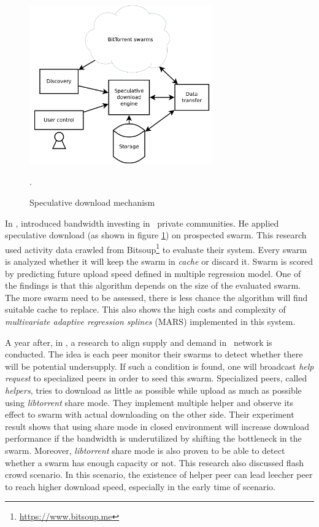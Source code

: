 \begin{figure}[t]
	\centering
	\includegraphics[width=0.7\textwidth]{pics/SDE2013.png}
	\caption{Speculative download mechanism \cite{2013:investmentcm:capota}}.
	\label{fig:sde13}
\end{figure}

In \citeyear{2013:investmentcm:capota}, \citeauthor{2013:investmentcm:capota} introduced bandwidth investing in \bt~private communities. He applied speculative download (as shown in figure \ref{fig:sde13}) on prospected swarm. This research used activity data crawled from Bitsoup\footnote{\url{https://www.bitsoup.me}} to evaluate their system. Every swarm is analyzed whether it will keep the swarm in \textit{cache} or discard it. Swarm is scored by predicting future upload speed defined in multiple regression model\cite{2013:investmentcm:capota}. One of the findings is that this algorithm depends on the size of the evaluated swarm. The more swarm need to be assessed, there is less chance the algorithm will find suitable cache to replace. This also shows the high costs and complexity of \textit{multivariate adaptive regression splines} (MARS) implemented in this system.

A year after, in \citeyear{2014:bwmarket:capota}, a research to align supply and demand in \bt~network is conducted. The idea is each peer monitor their swarms to detect whether there will be potential undersupply. If such a condition is found, one will broadcast \textit{help request} to specialized peers in order to seed this swarm. Specialized peers, called \textit{helpers}, tries to download as little as possible while upload as much as possible using \textit{libtorrent} share mode. They implement multiple helper and observe its effect to swarm with actual downloading on the other side. Their experiment result shows that using share mode in closed environment will increase download performance if the bandwidth is underutilized \cite{2014:bwmarket:capota} by shifting the bottleneck in the swarm. Moreover, \textit{libtorrent} share mode is also proven to be able to detect whether a swarm has enough capacity or not. This research also discussed flash crowd scenario. In this scenario, the existence of helper peer can lead leecher peer to reach higher download speed, especially in the early time of scenario. 

